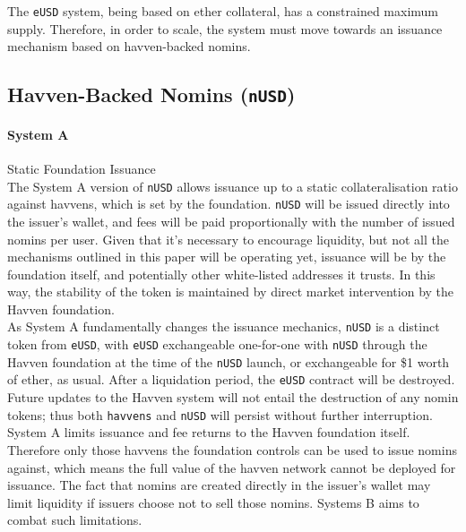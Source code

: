 \noindent The \texttt{eUSD} system, being based on ether collateral, has a constrained maximum supply.
Therefore, in order to scale, the system must move towards an issuance mechanism based on havven-backed
nomins.

\pagebreak
\subsection{Havven-Backed Nomins (\texttt{nUSD})}

\paragraph{System A} Static Foundation Issuance \\

\noindent The System A version of \texttt{nUSD} allows issuance up to a static
collateralisation ratio against havvens, which is set by the foundation.
\texttt{nUSD} will be issued directly into the issuer's wallet, and fees will be paid
proportionally with the number of issued nomins per user. Given that it's necessary to
encourage liquidity, but not all the mechanisms outlined in this paper will be operating
yet, issuance will be by the foundation itself, and potentially other white-listed
addresses it trusts. In this way, the stability of the token is maintained by direct
market intervention by the Havven foundation. \\

\noindent As System A fundamentally changes the issuance mechanics, \texttt{nUSD} is a distinct
token from \texttt{eUSD}, with \texttt{eUSD} exchangeable one-for-one with \texttt{nUSD}
through the Havven foundation at the time of the \texttt{nUSD} launch, or exchangeable
for \$1 worth of ether, as usual. After a liquidation period, the \texttt{eUSD} contract
will be destroyed.
Future updates to the Havven system will not entail the destruction of any nomin tokens; thus
both \texttt{havvens} and \texttt{nUSD} will persist without further interruption. \\

\noindent System A limits issuance and fee returns to the Havven foundation itself. Therefore
only those havvens the foundation controls can be used to issue nomins against, which means
the full value of the havven network cannot be deployed for issuance. The fact that nomins
are created directly in the issuer's wallet may limit liquidity if issuers choose not to sell
those nomins. Systems B aims to combat such limitations. \\


